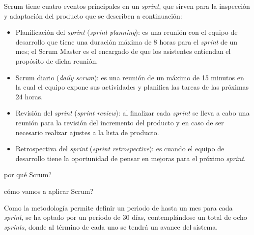 Scrum tiene cuatro eventos principales en  un \textit{sprint}, que sirven para la inspección y adaptación del producto que se describen a continuación:
\begin{itemize}
	\item Planificación del \textit{sprint} (\textit{sprint planning}): es una reunión con el equipo de desarrollo que tiene una duración máxima de 8 horas para el \textit{sprint} de un mes; el Scrum Master es el encargado de que los asistentes entiendan el propósito de dicha reunión.
	\item Scrum diario (\textit{daily scrum}): es una reunión de un máximo de 15 minutos en la cual el equipo expone sus actividades y planifica las tareas de las próximas 24 horas.
	\item Revisión del \textit{sprint} (\textit{sprint review}): al finalizar cada \textit{sprint} se lleva a cabo una reunión para la revisión del incremento del producto y en caso de ser necesario realizar ajustes a la lista de producto.
	\item Retrospectiva del \textit{sprint} (\textit{sprint retrospective}): es cuando el equipo de desarrollo tiene la oportunidad de pensar en mejoras para el próximo \textit{sprint}.
\end{itemize}

por qué Scrum?

cómo vamos a aplicar Scrum?

Como la metodología permite definir un periodo de hasta un mes para cada \textit{sprint}, se ha optado por un periodo de 30 días, contemplándose un total de ocho \textit{sprints}, donde al término de cada uno se tendrá un avance del sistema.